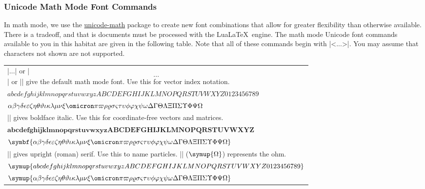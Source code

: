 \documentclass{article}
\newcommand*{\pkg}[1]{\textsf{#1}}                    %
\newcommand*{\lualatex}{Lua\LaTeX}                    %
\begin{document}
\subsubsection{Unicode Math Mode Font Commands}
In math mode, we use the 
\href{https://www.ctan.org/pkg/unicode-math}{\pkg{unicode-math}} 
package to create new font combinations 
that allow for greater flexibility than otherwise available. There is a tradeoff, and 
that is documents must be processed with the \lualatex\ engine. The math mode 
Unicode font commands available to you in this habitat are given in the following 
table. Note that all of these commands begin with |\sym<...>|. You may assume that 
characters not shown are not supported.
\begin{center}
  \begin{tabular}{l}
    |\(...\)| or |\[...\]| or |\symnormal{...}| give the default math mode font. 
    Use this for vector index notation. \\
    \( abcdefghijklmnopqrstuvwxyzABCDEFGHIJKLMNOPQRSTUVWXYZ0123456789 \) \\
    \( 
      \alpha\beta\gamma\delta\epsilon\varepsilon\zeta\eta\theta\vartheta\iota\kappa
      \lambda\mu\nu\xi\omicron\pi\varpi\rho\varrho\sigma\varsigma\tau\upsilon\phi\varphi
      \chi\psi\omega\Delta\Gamma\Theta\Lambda\Xi\Pi\Sigma\Upsilon\Phi\Psi\Omega 
    \) \\
    |\symbf{...}| gives boldface italic. Use this for coordinate-free 
    vectors and matrices. \\
    \( \symbf{abcdefghijklmnopqrstuvwxyzABCDEFGHIJKLMNOPQRSTUVWXYZ} \) \\
    \( \symbf{ 
       \alpha\beta\gamma\delta\epsilon\varepsilon\zeta\eta\theta\vartheta\iota\kappa
       \lambda\mu\nu\xi\omicron\pi\varpi\rho\varrho\sigma\varsigma\tau\upsilon\phi\varphi
       \chi\psi\omega\Delta\Gamma\Theta\Lambda\Xi\Pi\Sigma\Upsilon\Phi\Psi\Omega}
    \) \\
    |\symup{...}| gives upright (roman) serif. Use this to name particles.
    |\symup{\Omega}| (\(\symup{\Omega}\)) represents the ohm. \\
    \( \symup{abcdefghijklmnopqrstuvwxyzABCDEFGHIJKLMNOPQRSTUVWXYZ0123456789} \) \\
    \( \symup{ 
      \alpha\beta\gamma\delta\epsilon\varepsilon\zeta\eta\theta\vartheta\iota\kappa
      \lambda\mu\nu\xi\omicron\pi\varpi\rho\varrho\sigma\varsigma\tau\upsilon\phi\varphi
      \chi\psi\omega\Delta\Gamma\Theta\Lambda\Xi\Pi\Sigma\Upsilon\Phi\Psi\Omega}
    \) \\

\end{tabular}
\end{center}
\end{document}
